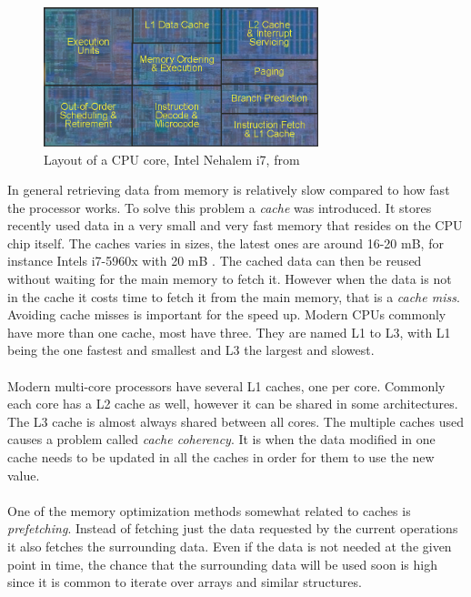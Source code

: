 \documentclass[10pt,a4paper]{report}
\begin{document}
\begin{figure}[h]
    \centering
    \includegraphics[width=8cm]{cpu_core_die.png}
    \caption{Layout of a CPU core, Intel Nehalem i7, from \cite{tomshardware_nehalem}}
    \label{fig:core_die}
\end{figure}

In general retrieving data from memory is relatively slow compared to how fast the processor works\cite{introduction_hpc_hager,drepper2007cpumemory}. %
To solve this problem a \emph{cache} was introduced\cite{drepper2007cpumemory}. It stores recently used data in a very small and very fast memory that resides on the CPU chip itself\cite{drepper2007cpumemory}. The caches varies in sizes, the latest ones are around 16-20 mB, for instance Intels i7-5960x with 20 mB \cite{intel_haswell_2014_5960x}. The cached data can then be reused without waiting for the main memory to fetch it. However when the data is not in the cache it costs time to fetch it from the main memory, that is a \emph{cache miss}\cite{drepper2007cpumemory}. Avoiding cache misses is important for the speed up\cite{drepper2007cpumemory}. Modern CPUs commonly have more than one cache, most have three\cite{introduction_hpc_hager}. They are named L1 to L3, with L1 being the one fastest and smallest and L3 the largest and slowest\cite{introduction_hpc_hager}.\\
\\
Modern multi-core processors have several L1 caches, one per core\cite{introduction_hpc_hager}. Commonly each core has a L2 cache as well, however it can be shared in some architectures\cite{introduction_hpc_hager}. The L3 cache is almost always shared between all cores\cite{introduction_hpc_hager}. The multiple caches used causes a problem called \emph{cache coherency}. It is when the data modified in one cache needs to be updated in all the caches in order for them to use the new value\cite{introduction_hpc_hager}.\\
\\
One of the memory optimization methods somewhat related to caches is \emph{prefetching}\cite{introduction_hpc_hager, drepper2007cpumemory}. Instead of fetching just the data requested by the current operations it also fetches the surrounding data\cite{drepper2007cpumemory}. Even if the data is not needed at the given point in time, the chance that the surrounding data will be used soon is high since it is common to iterate over arrays and similar structures\cite{introduction_hpc_hager}.\\
\end{document}
